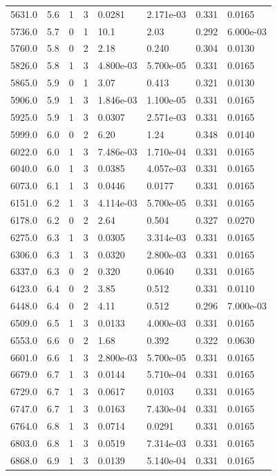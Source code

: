 \documentclass[preview]{standalone}
\begin{document}
{{{{\begin{tabular}{L{1.2cm}C{1.2cm} C{0.3cm}C{0.5cm} C{1.4cm}C{1.4cm} C{1.4cm}C{1.4cm}}
  5631.0  &   5.6  & 1     &  3 &  0.0281  & 2.171e-03  & 0.331 &  0.0165   \\ 
  5736.0  &   5.7  & 0     &  1 &  10.1  & 2.03  & 0.292 &  6.000e-03   \\ 
  5760.0  &   5.8  & 0     &  2 &  2.18  & 0.240  & 0.304 &  0.0130   \\ 
  5826.0  &   5.8  & 1     &  3 &  4.800e-03  & 5.700e-05  & 0.331 &  0.0165   \\ 
  5865.0  &   5.9  & 0     &  1 &  3.07  & 0.413  & 0.321 &  0.0130   \\ 
  5906.0  &   5.9  & 1     &  3 &  1.846e-03  & 1.100e-05  & 0.331 &  0.0165   \\ 
  5925.0  &   5.9  & 1     &  3 &  0.0307  & 2.571e-03  & 0.331 &  0.0165   \\ 
  5999.0  &   6.0  & 0     &  2 &  6.20  & 1.24  & 0.348 &  0.0140   \\ 
  6022.0  &   6.0  & 1     &  3 &  7.486e-03  & 1.710e-04  & 0.331 &  0.0165   \\ 
  6040.0  &   6.0  & 1     &  3 &  0.0385  & 4.057e-03  & 0.331 &  0.0165   \\ 
  6073.0  &   6.1  & 1     &  3 &  0.0446  & 0.0177  & 0.331 &  0.0165   \\ 
  6151.0  &   6.2  & 1     &  3 &  4.114e-03  & 5.700e-05  & 0.331 &  0.0165   \\ 
  6178.0  &   6.2  & 0     &  2 &  2.64  & 0.504  & 0.327 &  0.0270   \\ 
  6275.0  &   6.3  & 1     &  3 &  0.0305  & 3.314e-03  & 0.331 &  0.0165   \\ 
  6306.0  &   6.3  & 1     &  3 &  0.0320  & 2.800e-03  & 0.331 &  0.0165   \\ 
  6337.0  &   6.3  & 0     &  2 &  0.320  & 0.0640  & 0.331 &  0.0165   \\ 
  6423.0  &   6.4  & 0     &  2 &  3.85  & 0.512  & 0.331 &  0.0110   \\ 
  6448.0  &   6.4  & 0     &  2 &  4.11  & 0.512  & 0.296 &  7.000e-03   \\ 
  6509.0  &   6.5  & 1     &  3 &  0.0133  & 4.000e-03  & 0.331 &  0.0165   \\ 
  6553.0  &   6.6  & 0     &  2 &  1.68  & 0.392  & 0.322 &  0.0630   \\ 
  6601.0  &   6.6  & 1     &  3 &  2.800e-03  & 5.700e-05  & 0.331 &  0.0165   \\ 
  6679.0  &   6.7  & 1     &  3 &  0.0144  & 5.710e-04  & 0.331 &  0.0165   \\ 
  6729.0  &   6.7  & 1     &  3 &  0.0617  & 0.0103  & 0.331 &  0.0165   \\ 
  6747.0  &   6.7  & 1     &  3 &  0.0163  & 7.430e-04  & 0.331 &  0.0165   \\ 
  6764.0  &   6.8  & 1     &  3 &  0.0714  & 0.0291  & 0.331 &  0.0165   \\ 
  6803.0  &   6.8  & 1     &  3 &  0.0519  & 7.314e-03  & 0.331 &  0.0165   \\ 
  6868.0  &   6.9  & 1     &  3 &  0.0139  & 5.140e-04  & 0.331 &  0.0165   \\ 
\hline 
\end{tabular} 

}}}}
\end{document}
